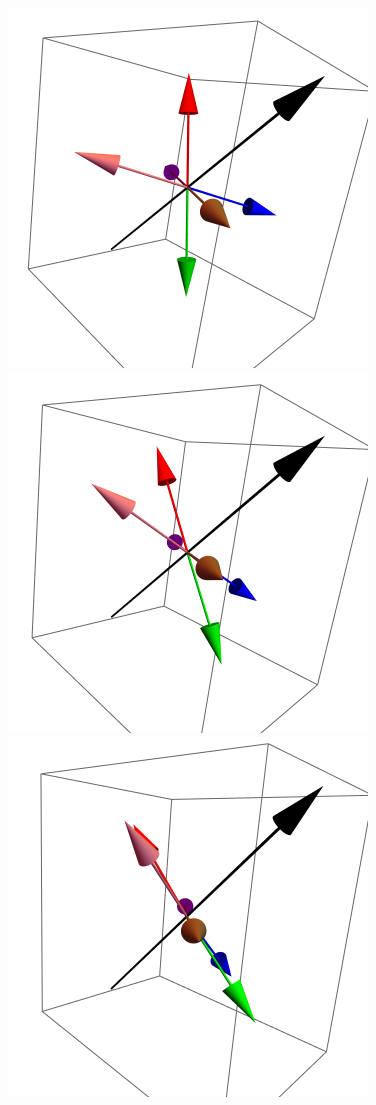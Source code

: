 \documentclass{article}
\begin{document}
\begin{figure}[ht]
\centering
\includegraphics[scale=0.22]{HVariedData/Pictures/101Inc1.png}
\includegraphics[scale=0.22]{HVariedData/Pictures/101Inc56.png}
\includegraphics[scale=0.22]{HVariedData/Pictures/101Inc61.png}

\end{figure}
\end{document}

